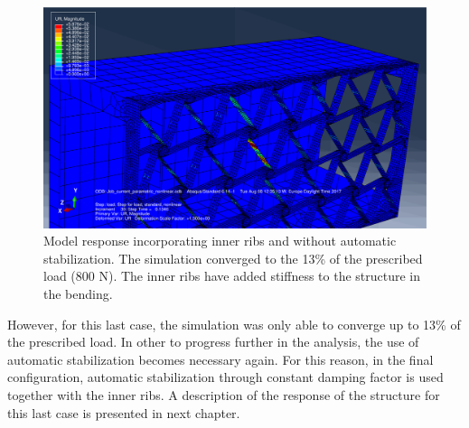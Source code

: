     \begin{figure}[!htpb]
      \centering
      \includegraphics[width=0.8 \textwidth]{figures/result-model/normalCaseNoDamp2InnerRibs_800N}
      \caption[Model response incorporating inner ribs and without automatic stabilization]{Model response incorporating inner ribs and without automatic stabilization. The simulation converged to the 13\% of the prescribed load (800 N). The inner ribs have added stiffness to the structure in the bending.}
      \label{fig:normalCaseNoDamp2InnerRibs}
    \end{figure}

    However, for this last case, the simulation was only able to converge up to 13\% of the prescribed load. In other to progress further in the analysis, the use of automatic stabilization becomes necessary again. For this reason, in the final configuration, automatic stabilization through constant damping factor is used together with the inner ribs. A description of the response of the structure for this last case is presented in next chapter.
